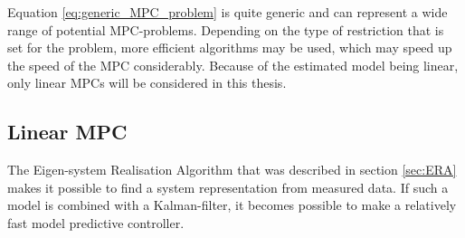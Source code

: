 
\noindent
Equation \ref{eq:generic_MPC_problem} is quite generic and can represent a wide range of potential MPC-problems. Depending on the type of restriction that is set for the problem, more efficient algorithms may be used, which may speed up the speed of the MPC considerably. Because of the estimated model being linear, only linear MPCs will be considered in this thesis.







\subsection{Linear MPC}



The Eigen-system Realisation Algorithm that was described in section \ref{sec:ERA} makes it possible to find a system representation from measured data. If such a model is combined with a Kalman-filter, it becomes possible to make a relatively fast model predictive controller. 


